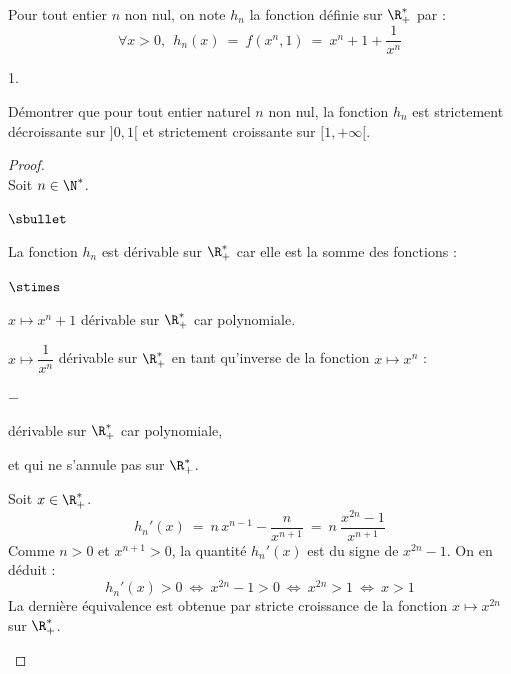\documentclass[11pt]{article}%
\begin{document}
\noindent
Pour tout entier $n$ non nul, on note $h_n$ la fonction définie sur
$\R_+^{*}$ par :
\[
\forall x >0, \ \ h_n(x) \ = \ f(x^n,1) \ = \ x^n + 1 + \dfrac{1}{x^n}
\]
\begin{noliste}{1.}
  \setlength{\itemsep}{4mm} %
  \setcounter{enumi}{2}
\item Démontrer que pour tout entier naturel $n$ non nul, la fonction
  $h_n$ est strictement décroissante sur $]0,1[$ et strictement
  croissante sur $[1,+\infty[$.
  
  \begin{proof}~\\%
    Soit $n \in \N^*$.
    \begin{noliste}{$\sbullet$}
    \item La fonction $h_n$ est dérivable sur $\R_+^*$ car elle est la
      somme des fonctions :
      \begin{noliste}{$\stimes$}
      \item $x \mapsto x^n + 1$ dérivable sur $\R_+^*$ car
        polynomiale.

      \item $x \mapsto \dfrac{1}{x^n}$ dérivable sur $\R_+^*$ en tant
        qu'inverse de la fonction $x \mapsto x^n$ :
        \begin{noliste}{$-$}
        \item dérivable sur $\R_+^*$ car polynomiale,
        \item et qui ne s'annule pas sur $\R_+^*$.
        \end{noliste}        
      \end{noliste}

    \item Soit $x \in \R_+^*$.
      \[
      h_n'(x) \ = \ n \, x^{n-1} - \dfrac{n}{x^{n+1}} \ = \ n \
      \dfrac{x^{2n} - 1}{x^{n+1}}
      \]
      Comme $n > 0$ et $x^{n+1} > 0$, la quantité $h_n'(x)$ est du
      signe de $x^{2n} - 1$. On en déduit :
      \[
      h_n'(x) > 0 \ \Leftrightarrow \ x^{2n} - 1 > 0 \ \Leftrightarrow
      \ x^{2n} > 1  \ \Leftrightarrow \ x > 1
      \]
      La dernière équivalence est obtenue par stricte croissance de la
      fonction $x \mapsto x^{2n}$ sur $\R_+^*$.


\end{noliste}
\end{proof}
\end{noliste}
\end{document}
